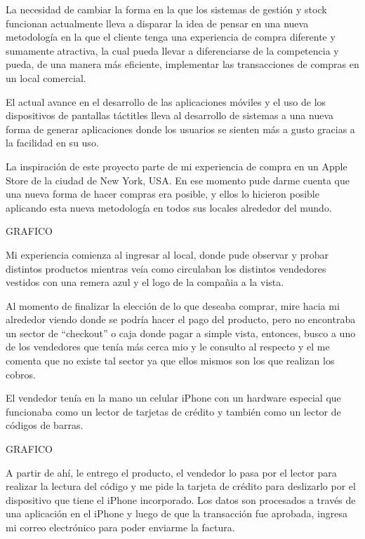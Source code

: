 
La necesidad de cambiar la forma en la que los sistemas de gesti\'on y stock funcionan actualmente lleva a disparar la idea de pensar en una nueva metodolog\'ia en la que el cliente tenga una experiencia de compra diferente y sumamente atractiva, la cual pueda llevar a diferenciarse de la competencia y pueda, de una manera m\'as eficiente, implementar las transacciones de compras en un local comercial.

El actual avance en el desarrollo de las aplicaciones m\'oviles y el uso de los dispositivos de pantallas t\'actitles lleva al desarrollo de sistemas a una nueva forma de generar aplicaciones donde los usuarios se sienten m\'as a gusto gracias a la facilidad en su uso.

La inspiraci\'on de este proyecto parte de mi experiencia de compra en un Apple Store de la ciudad de New York, USA. En ese momento pude darme cuenta que una nueva forma de hacer compras era posible, y ellos lo hicieron posible aplicando esta nueva metodolog\'ia en todos sus locales alrededor del mundo.

GRAFICO

Mi experiencia comienza al ingresar al local, donde pude observar y probar distintos productos mientras ve\'ia como circulaban los distintos vendedores vestidos con una remera azul y el logo de la compa\~nia a la vista.

Al momento de finalizar la elecci\'on de lo que deseaba comprar, mire hacia mi alrededor viendo donde se podr\'ia hacer el pago del producto, pero no encontraba un sector de ``checkout'' o caja donde pagar a simple vista, entonces, busco a uno de los vendedores que ten\'ia m\'as cerca mio y le consulto al respecto y el me comenta que no existe tal sector ya que ellos mismos son los que realizan los cobros.

El vendedor ten\'ia en la mano un celular iPhone con un hardware especial que funcionaba como un lector de tarjetas de cr\'edito y tambi\'en como un lector de c\'odigos de barras.

GRAFICO

A partir de ah\'i, le entrego el producto, el vendedor lo pasa por el lector para realizar la lectura del c\'odigo y me pide la tarjeta de cr\'edito para deslizarlo por el dispositivo que tiene el iPhone incorporado. Los datos son procesados a trav\'es de una aplicaci\'on en el iPhone y luego de que la transacci\'on fue aprobada, ingresa mi correo electr\'onico para poder enviarme la factura.

